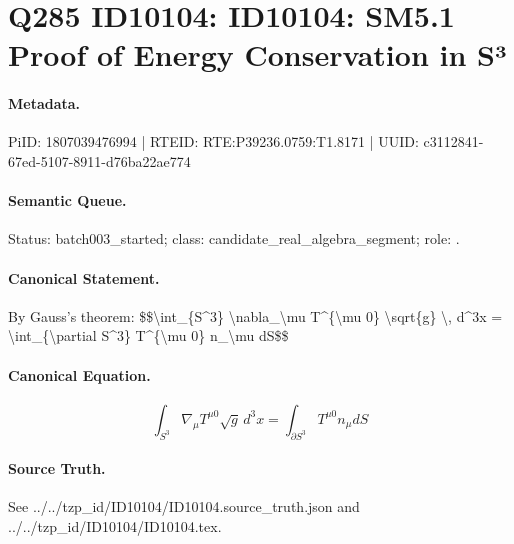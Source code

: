 \section*{Q285 ID10104: ID10104: SM5.1 Proof of Energy Conservation in S³}
\paragraph{Metadata.}
PiID: 1807039476994 | RTEID: RTE:P39236.0759:T1.8171 | UUID: c3112841-67ed-5107-8911-d76ba22ae774

\paragraph{Semantic Queue.}
Status: batch003\_started; class: candidate\_real\_algebra\_segment; role: .

\paragraph{Canonical Statement.}
By Gauss's theorem: \$\$\textbackslash{}int\_\{S\textasciicircum{}3\} \textbackslash{}nabla\_\textbackslash{}mu T\textasciicircum{}\{\textbackslash{}mu 0\} \textbackslash{}sqrt\{g\} \textbackslash{}, d\textasciicircum{}3x = \textbackslash{}int\_\{\textbackslash{}partial S\textasciicircum{}3\} T\textasciicircum{}\{\textbackslash{}mu 0\} n\_\textbackslash{}mu dS\$\$

\paragraph{Canonical Equation.}
\[
\int_{S^3} \nabla_\mu T^{\mu 0} \sqrt{g} \, d^3x = \int_{\partial S^3} T^{\mu 0} n_\mu dS
\]

\paragraph{Source Truth.}
See ../../tzp\_id/ID10104/ID10104.source\_truth.json and ../../tzp\_id/ID10104/ID10104.tex.
